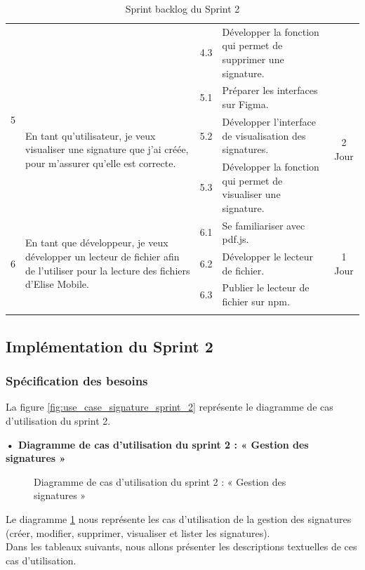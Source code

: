 \begin{adjustwidth}{-1cm}{}
\begin{longtable}{|c|p{6cm}|c|p{6cm}|c|}
      \cline{3-4}
      & & 4.3 & Développer la fonction qui permet de supprimer une signature. & \\
      \cline{1-5}
      \multirow{2}{*}{5} & \multirow{3}{6cm}{En tant qu'utilisateur, je veux visualiser une signature que j'ai créée, pour m'assurer qu'elle est correcte.} & 5.1 & Préparer les interfaces sur Figma. & \multirow{3}{*}{2 Jour} \\
      \cline{3-4}
      & & 5.2 & Développer l'interface de visualisation des signatures. & \\
      \cline{3-4}
      & & 5.3 & Développer la fonction qui permet de visualiser une signature. & \\
      \cline{1-5}
      \multirow{3}{*}{6} & \multirow{3}{6cm}{En tant que développeur, je veux développer un lecteur de fichier afin de l'utiliser pour la lecture des fichiers d'Elise Mobile.} & 6.1 & Se familiariser avec pdf.js. & \multirow{3}{*}{1 Jour} \\
      \cline{3-4}
      & & 6.2 & Développer le lecteur de fichier. & \\
      \cline{3-4}
      & & 6.3 & Publier le lecteur de fichier sur npm. & \\
  \hline
  \caption{Sprint backlog du Sprint 2}
  \label{tab:sprint-backlog-2}
\end{longtable}
\end{adjustwidth}

\subsection{Implémentation du Sprint 2}

\subsubsection{Spécification des besoins}
La figure \ref{fig:use_case_signature_sprint_2} représente le diagramme de cas d'utilisation du sprint 2.

\textbf{•	Diagramme de cas d'utilisation du sprint 2 : « Gestion des signatures »}

\begin{figure}[H]
  \centering
  \caption{Diagramme de cas d'utilisation du sprint 2 : « Gestion des signatures »}
  \label{fig:UseCaseDiagram}
\end{figure}

Le diagramme \ref{fig:UseCaseDiagram} nous représente les cas d'utilisation de la gestion des signatures (créer, modifier, supprimer, visualiser et lister les signatures). \\
Dans les tableaux suivants, nous allons présenter les descriptions textuelles de ces cas d'utilisation.

